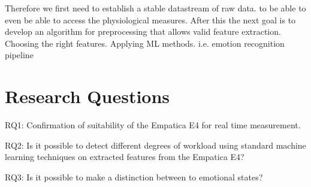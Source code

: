 Therefore we first need to establish a stable datastream of raw data. to be able to even  be able to access the physiological measures.
After this the next goal is to develop an algorithm for preprocessing that allows valid feature extraction.
Choosing the right features.
Applying ML methods. i.e. emotion recognition pipeline

\section{Research Questions}
RQ1: Confirmation of suitability of the Empatica E4 for real time measurement.

RQ2: Is it possible to detect different degrees of workload using standard machine learning techniques on extracted features from the Empatica E4?

RQ3: Is it possible to make a distinction between to emotional states?

